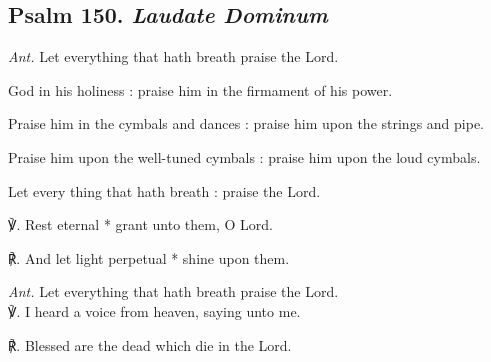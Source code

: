 \subsection{Psalm 150. \textit{Laudate Dominum}}\par\noindent
\textit{Ant.} Let everything that hath breath {\dag} praise the Lord.\par
{} God in his holiness : praise him in the firmament of his power.\par
{}
Praise him in the cymbals and dances : praise him upon the strings and pipe.\par
{}Praise him upon the well-tuned cymbals : praise him upon the loud cymbals.\par
{}Let every thing that hath breath : praise the Lord.\par
℣. Rest eternal * grant unto them, O Lord.\par
℟. And let light perpetual * shine upon them.\par\noindent
\textit{Ant.} Let everything that hath breath praise the Lord.\\

℣. I heard a voice from heaven, saying unto me.\par
℟. Blessed are the dead which die in the Lord.

\clearpage
